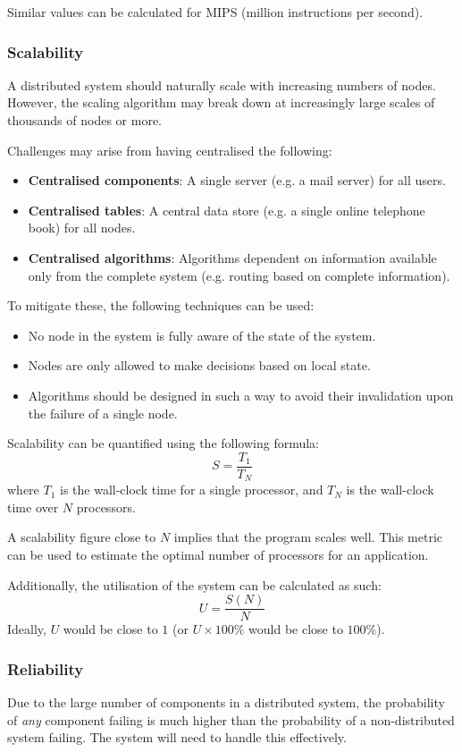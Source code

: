 Similar values can be calculated for MIPS (million instructions per second).

\subsubsection{Scalability}
A distributed system should naturally scale with increasing numbers of nodes. However, the scaling algorithm may break down at increasingly large scales of thousands of nodes or more.

Challenges may arise from having centralised the following:

\begin{itemize}
\item \textbf{Centralised components}: A single server (e.g. a mail server) for all users.
\item \textbf{Centralised tables}: A central data store (e.g. a single online telephone book) for all nodes.
\item \textbf{Centralised algorithms}: Algorithms dependent on information available only from the complete system (e.g. routing based on complete information).
\end{itemize}

To mitigate these, the following techniques can be used:

\begin{itemize}
\item No node in the system is fully aware of the state of the system.
\item Nodes are only allowed to make decisions based on local state.
\item Algorithms should be designed in such a way to avoid their invalidation upon the failure of a single node.
\end{itemize}

Scalability can be quantified using the following formula:
\[ S = \frac{T_1}{T_N}  \]
where $T_1$ is the wall-clock time for a single processor, and $T_N$ is the wall-clock time over $N$ processors.

A scalability figure close to $N$ implies that the program scales well. This metric can be used to estimate the optimal number of processors for an application.

Additionally, the utilisation of the system can be calculated as such:
\[ U = \frac{S(N)}{N} \]
Ideally, $U$ would be close to $1$ (or $U \times 100\%$ would be close to $100\%$).

\subsubsection{Reliability}
Due to the large number of components in a distributed system, the probability of \textit{any} component failing is much higher than the probability of a non-distributed system failing. The system will need to handle this effectively.

